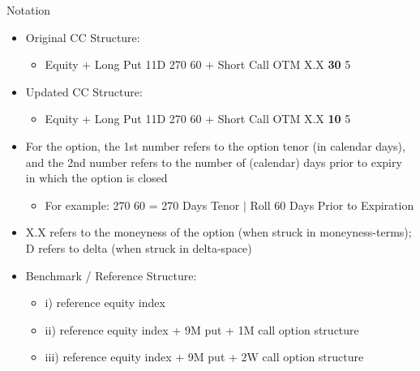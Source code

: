 \documentclass{beamer}
\begin{document}
\begin{frame}{Notation}
\begin{itemize}

\item Original CC Structure: 
\begin{itemize}
\item Equity + Long Put 11D {\color{green} 270 60} + Short Call OTM {\color {red}X.X} {\color{green} {\bf 30} 5}
\end{itemize}
\vfill
\item Updated CC Structure: 
\begin{itemize}
\item Equity + Long Put 11D {\color{green} 270 60} + Short Call OTM {\color {red}X.X} {\color{green} {\bf 10} 5}
\end{itemize}
\item For the option, the 1st number refers to the option tenor (in calendar days), and the 2nd number refers to the number of (calendar) days prior to expiry in which the option is closed
\begin{itemize}
\item For example: {\color{green} 270 60} = 270 Days Tenor $|$ Roll 60 Days Prior to Expiration
\end{itemize}
\vfill
\item {\color {red}X.X} refers to the moneyness of the option (when struck in moneyness-terms); D refers to delta (when struck in delta-space)
\vfill
\item {\color{blue} Benchmark / Reference Structure}: 
\begin{itemize}
\item i) reference equity index
\item ii) reference equity index + 9M put + 1M call option structure
\item iii) reference equity index + 9M put + 2W call option structure
\end{itemize}
\end{itemize}
\end{frame}
\end{document}
